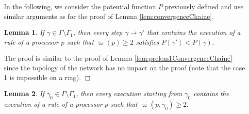 \documentclass[11pt,english,letterpaper]{article}
\newtheorem{lemma}{Lemma}
\newenvironment{proof}{{\noindent\bf Proof. } }{{\hfill $\Box$}}
\begin{document}
In the following, we consider the potential function $P$ previously defined and use similar arguments as for the proof of Lemma \ref{lem:convergenceChaine}.

\begin{lemma}\label{lem:prelem1ConvergenceAnneau}
If $\gamma\in\Gamma\setminus\Gamma_{1}$, then every step $\gamma\rightarrow\gamma'$ that contains the execution of a rule of a processor $p$ such that $\varpi(p)\geq 2$ satisfies $P(\gamma')<P(\gamma)$.
\end{lemma}

\begin{proof}
The proof is similar to the proof of Lemma \ref{lem:prelem1ConvergenceChaine} since the topology of the network has no impact on the proof (note that the case 1 is impossible on a ring).
\end{proof}

\begin{lemma}\label{lem:prelem2ConvergenceAnneau}
If $\gamma_{0}\in\Gamma\setminus\Gamma_{1}$, then every execution starting from $\gamma_{0}$ contains the execution of a rule of a processor $p$ such that $\varpi(p,\gamma_{0})\geq 2$.
\end{lemma}
\end{document}
